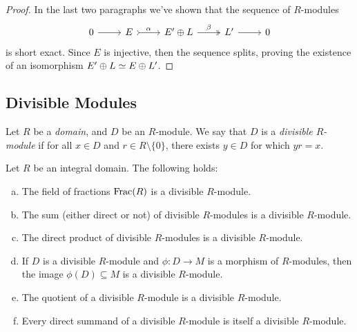 \begin{proof}
In the last two paragraphs we've shown that the sequence of \(R\)-modules
\[
\begin{tikzcd}
0 \ar[r]
&E \ar[r, tail, "\alpha"]
&E' \oplus L \ar[r, two heads, "\beta"]
&L' \ar[r]
&0
\end{tikzcd}
\]
is short exact. Since \(E\) is injective, then the sequence splits, proving the
existence of an isomorphism \(E' \oplus L \simeq E \oplus L'\).
\end{proof}

\subsection{Divisible Modules}

\begin{definition}
\label{def:divisible-module}
Let \(R\) be a \emph{domain}, and \(D\) be an \(R\)-module. We say that \(D\) is
a \emph{divisible \(R\)-module} if for all \(x \in D\) and
\(r \in R \setminus \{0\}\), there exists \(y \in D\) for which \(y r = x\).
\end{definition}

\begin{proposition}
\label{prop:properties-divisible-modules}
Let \(R\) be an integral domain. The following holds:
\begin{enumerate}[(a)]\setlength\itemsep{0em}
\item The field of fractions \(\operatorname{Frac}(R)\) is a divisible \(R\)-module.

\item The sum (either direct or not) of divisible \(R\)-modules is a divisible
  \(R\)-module.

\item The direct product of divisible \(R\)-modules is a divisible \(R\)-module.

\item If \(D\) is a divisible \(R\)-module and \(\phi: D \to M\) is a morphism
  of \(R\)-modules, then the image \(\phi(D) \subseteq M\) is a divisible
  \(R\)-module.

\item The quotient of a divisible \(R\)-module is a divisible \(R\)-module.

\item Every direct summand of a divisible \(R\)-module is itself a divisible
  \(R\)-module.
\end{enumerate}
\end{proposition}

